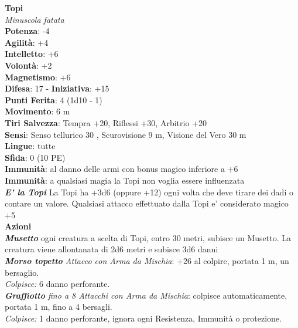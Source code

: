 \begin{multicols}{2}
\medskip\textbf{Topi}\\
\emph{Minuscola fatata}\\
\textbf{Potenza}: -4\\
\textbf{Agilità}: +4\\
\textbf{Intelletto}: +6\\
\textbf{Volontà}: +2\\
\textbf{Magnetismo}: +6\\
\textbf{Difesa}: 17 - \textbf{Iniziativa}: +15\\
\textbf{Punti Ferita}: 4 (1d10 - 1)\\
\textbf{Movimento}: 6 m\\
\textbf{Tiri Salvezza}: Tempra +20, Riflessi +30, Arbitrio +20 \\
\textbf{Sensi}: Senso tellurico 30 , Scurovisione 9 m, Visione del Vero 30 m\\
\textbf{Lingue}: tutte\\
\textbf{Sfida}: 0 (10 PE)\smallskip\\
\textbf{Immunità}: al danno delle armi con bonus magico inferiore a +6\\
\textbf{Immunità}: a qualsiasi magia la Topi non voglia essere influenzata\\
\emph{\textbf{E' la Topi}} La Topi ha +3d6 (oppure +12) ogni volta che deve tirare dei dadi o contare un valore. Qualsiasi attacco effettuato dalla Topi e' considerato magico +5\\
\smallskip\textbf{Azioni}\\
\emph{\textbf{Musetto}} ogni creatura a scelta di Topi, entro 30 metri, subisce un Musetto. La creatura viene allontanata di 2d6 metri e subisce 3d6 danni\\
\emph{\textbf{Morso topetto} Attacco con Arma da Mischia}: +26 al colpire, portata 1 m, un bersaglio.\\
\emph{Colpisce:} 6 danno perforante.\\
\emph{\textbf{Graffiotto} fino a 8 Attacchi con Arma da Mischia}: colpisce automaticamente, portata 1 m, fino a 4 bersagli.\\
\emph{Colpisce:} 1 danno perforante, ignora ogni Resistenza, Immunità o protezione.\\



\end{multicols}
